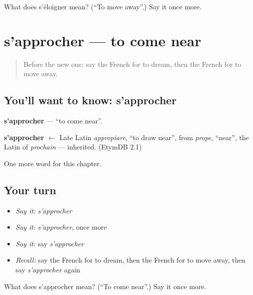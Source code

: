 \begin{tcolorbox}[breakable,colback=teal!4,colframe=teal!35!black,title={Before you move on}]
What does s'éloigner mean? (\textquotedblleft{}To move away\textquotedblright{}.) Say it once more.
\end{tcolorbox}
\section[s'approcher]{s'approcher — to come near}

\label{lesson:FR-C150-approcher}



\begin{quote}
Before the new one: say the French for to dream, then the French for to move away.
\end{quote}

\subsection*{You'll want to know: s'approcher}
\textbf{s'approcher} — \textquotedblleft{}to come near\textquotedblright{}.

\begin{cousinweb}
\textbf{s'approcher} $\leftarrow$ Late Latin \emph{appropiare}, \textquotedblleft{}to draw near\textquotedblright{}, from \emph{prope}, \textquotedblleft{}near\textquotedblright{}, the Latin of \emph{prochain} — inherited. (EtymDB 2.1)
\end{cousinweb}

\begin{grammarlens}[title={What you've built}]
One more word for this chapter.
\end{grammarlens}

\subsection*{Your turn}
\begin{itemize}
\raggedright
  \item \emph{Say it:} \emph{s'approcher}
  \item \emph{Say it:} \emph{s'approcher}, once more
  \item \emph{Say it:} say \emph{s'approcher}
  \item \emph{Recall:} say the French for to dream, then the French for to move away, then say \emph{s'approcher} again
\end{itemize}

\begin{tcolorbox}[breakable,colback=teal!4,colframe=teal!35!black,title={Before you move on}]
What does s'approcher mean? (\textquotedblleft{}To come near\textquotedblright{}.) Say it once more.
\end{tcolorbox}
